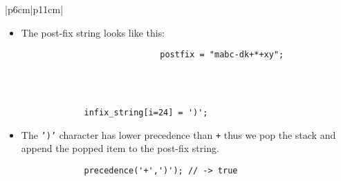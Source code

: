 \begin{center}
\begin{longtable}{ |p{6cm}|p{11cm}| }
\begin{itemize}
                \item The post-fix string looks like this:
                    {
                        \begin{verbatim}
                            postfix = "mabc-dk+*+xy";
                        \end{verbatim}
                    }
            \end{itemize} \\ 
        \hline 
        \hline
         \\
        \hline 
        \hline
        {
            \begin{verbatim}
                infix_string[i=24] = ')';
            \end{verbatim}
        }
        \begin{itemize}
            \item The \texttt{')'} character has lower precedence than \texttt{+} thus we pop the stack and append the popped item to the post-fix string.
        \end{itemize}
        {
            \begin{verbatim}
                precedence('+',')'); // -> true
            \end{verbatim}
}
\end{longtable}
\end{center}
